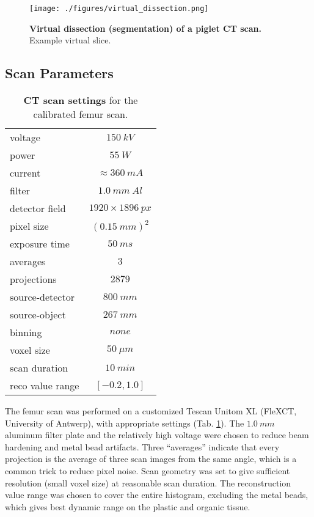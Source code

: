 \begin{figure}[p]
\centering
\texttt{[image: ./figures/virtual\_dissection.png]}
\caption{\label{fig:piglet_segmentation}\textbf{Virtual dissection (segmentation) of a piglet CT scan.} Example virtual slice.}
\end{figure}
\subsection{Scan Parameters}
\label{sec:org8c732af}

\begin{table}[p]
\caption{\label{tab:ct_settings}\textbf{CT scan settings} for the calibrated femur scan.}
\centering
\begin{tabular}{|l|c|}
\hline
voltage & \(150\ kV\)\\[0pt]
power & \(55\ W\)\\[0pt]
current & \(\approx 360\ mA\)\\[0pt]
filter & \(1.0\ mm\ Al\)\\[0pt]
detector field & \(1920\times 1896\ px\)\\[0pt]
pixel size & \((0.15\ mm)^{2}\)\\[0pt]
exposure time & \(50\ ms\)\\[0pt]
averages & \(3\)\\[0pt]
projections & \(2879\)\\[0pt]
source-detector & \(800\ mm\)\\[0pt]
source-object & \(267\ mm\)\\[0pt]
binning & \(none\)\\[0pt]
voxel size & \(50\ \mu m\)\\[0pt]
scan duration & \(10\ min\)\\[0pt]
reco value range & \([-0.2, 1.0]\)\\[0pt]
\hline
\end{tabular}
\end{table}

The femur scan was performed on a customized Tescan Unitom XL (FleXCT, University of Antwerp), with appropriate settings (Tab. \ref{tab:ct_settings}).
The \(1.0\ mm\) aluminum filter plate and the relatively high voltage were chosen to reduce beam hardening and metal bead artifacts.
Three ``averages'' indicate that every projection is the average of three scan images from the same angle, which is a common trick to reduce pixel noise.
Scan geometry was set to give sufficient resolution (small voxel size) at reasonable scan duration.
The reconstruction value range was chosen to cover the entire histogram, excluding the metal beads, which gives best dynamic range on the plastic and organic tissue.


